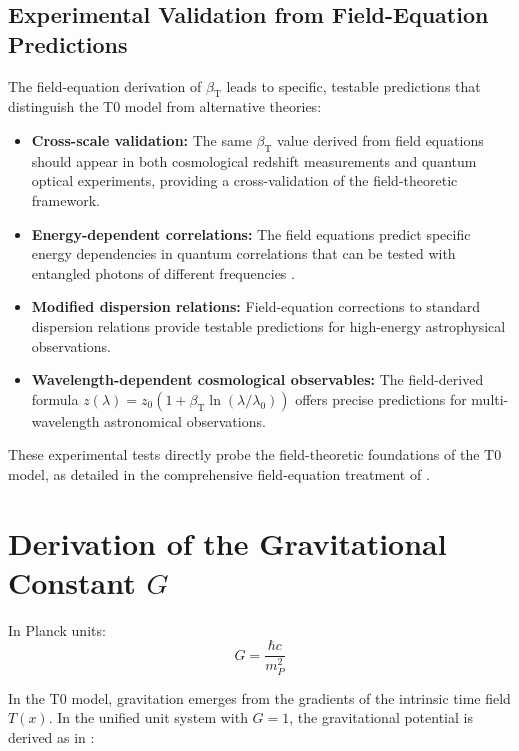 \documentclass[12pt,a4paper]{article}
\newcommand{\Tfield}{T(x)}
\newcommand{\betaT}{\beta_{\text{T}}}
\begin{document}
	\subsection{Experimental Validation from Field-Equation Predictions}
	\label{subsec:beta_experimental}
	
	The field-equation derivation of \(\betaT\) leads to specific, testable predictions that distinguish the T0 model from alternative theories:
	
	\begin{itemize}
		\item \textbf{Cross-scale validation:} The same \(\betaT\) value derived from field equations should appear in both cosmological redshift measurements and quantum optical experiments, providing a cross-validation of the field-theoretic framework.
		
		\item \textbf{Energy-dependent correlations:} The field equations predict specific energy dependencies in quantum correlations that can be tested with entangled photons of different frequencies \cite{pascher_photons_2025}.
		
		\item \textbf{Modified dispersion relations:} Field-equation corrections to standard dispersion relations provide testable predictions for high-energy astrophysical observations.
		
		\item \textbf{Wavelength-dependent cosmological observables:} The field-derived formula \(z(\lambda) = z_0 (1 + \betaT \ln(\lambda/\lambda_0))\) offers precise predictions for multi-wavelength astronomical observations.
	\end{itemize}
	
	These experimental tests directly probe the field-theoretic foundations of the T0 model, as detailed in the comprehensive field-equation treatment of \cite{pascher_photons_2025}.
	
	\section{Derivation of the Gravitational Constant \(G\)}
	\label{sec:gravitational_constant}
	
	In Planck units:
	\begin{equation}
		G = \frac{\hbar c}{m_P^2}
	\end{equation}
	
	In the T0 model, gravitation emerges from the gradients of the intrinsic time field \(\Tfield\). In the unified unit system with \(G = 1\), the gravitational potential is derived as in \cite{pascher_emergente_gravitation_2025}:
	
\end{document}
